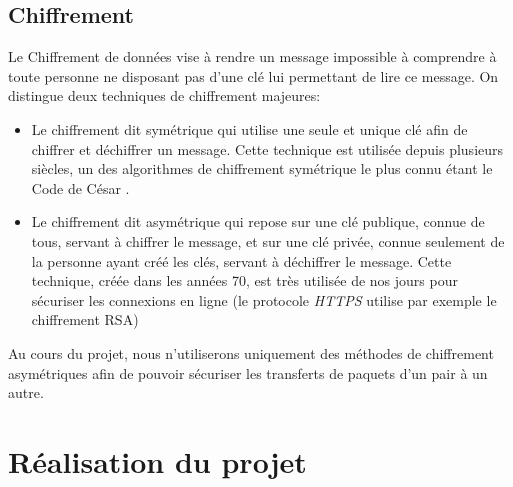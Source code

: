 \documentclass[11pt, a4paper]{specifications}
\begin{document}
    \subsection{Chiffrement}
Le Chiffrement de données vise à rendre un message impossible à comprendre à toute personne ne disposant pas d’une clé lui permettant de lire ce message. On distingue deux techniques de chiffrement majeures:
\begin{itemize}
\item Le chiffrement dit \og symétrique \fg qui utilise une seule et unique clé afin de chiffrer et déchiffrer un message. Cette technique est utilisée depuis plusieurs siècles, un des algorithmes de chiffrement symétrique le plus connu étant le \og Code de César \fg.
\item Le chiffrement dit \og asymétrique \fg qui repose sur une clé publique, connue de tous, servant à chiffrer le message, et sur une clé privée, connue seulement de la personne ayant créé les clés, servant à déchiffrer le message. Cette technique, créée dans les années 70, est très utilisée de nos jours pour sécuriser les connexions en ligne (le protocole \textit{HTTPS} utilise par exemple le chiffrement RSA)
\end{itemize}
Au cours du projet, nous n'utiliserons uniquement des méthodes de chiffrement asymétriques afin de pouvoir sécuriser les transferts de paquets d’un pair à un autre.
 
    \section{Réalisation du projet}
 
\end{document}
